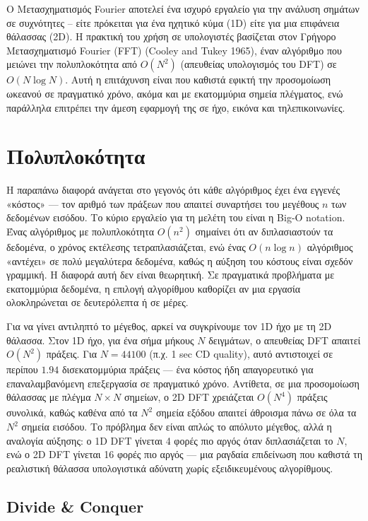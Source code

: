 Ο Μετασχηματισμός Fourier αποτελεί ένα ισχυρό εργαλείο για την ανάλυση
σημάτων σε συχνότητες -- είτε πρόκειται για ένα ηχητικό κύμα (1D) είτε
για μια επιφάνεια θάλασσας (2D). Η πρακτική του χρήση σε υπολογιστές
βασίζεται στον Γρήγορο Μετασχηματισμό Fourier (FFT) (Cooley and Tukey
1965), έναν αλγόριθμο που μειώνει την πολυπλοκότητα από \(O(N^2)\)
(απευθείας υπολογισμός του DFT) σε \(O(N \log N)\). Αυτή η επιτάχυνση
είναι που καθιστά εφικτή την προσομοίωση ωκεανού σε πραγματικό χρόνο,
ακόμα και με εκατομμύρια σημεία πλέγματος, ενώ παράλληλα επιτρέπει την
άμεση εφαρμογή της σε ήχο, εικόνα και τηλεπικοινωνίες.

\section{Πολυπλοκότητα}\label{ux3c0ux3bfux3bbux3c5ux3c0ux3bbux3bfux3baux3ccux3c4ux3b7ux3c4ux3b1}

Η παραπάνω διαφορά ανάγεται στο γεγονός ότι κάθε αλγόριθμος έχει ένα
εγγενές «κόστος» --- τον αριθμό των πράξεων που απαιτεί συναρτήσει του
μεγέθους \(n\) των δεδομένων εισόδου. Το κύριο εργαλείο για τη μελέτη
του είναι η Big-O notation. Ένας αλγόριθμος με πολυπλοκότητα \(O(n^2)\)
σημαίνει ότι αν διπλασιαστούν τα δεδομένα, ο χρόνος εκτέλεσης
τετραπλασιάζεται, ενώ ένας \(O(n \log n)\) αλγόριθμος «αντέχει» σε πολύ
μεγαλύτερα δεδομένα, καθώς η αύξηση του κόστους είναι σχεδόν γραμμική. Η
διαφορά αυτή δεν είναι θεωρητική. Σε πραγματικά προβλήματα με
εκατομμύρια δεδομένα, η επιλογή αλγορίθμου καθορίζει αν μια εργασία
ολοκληρώνεται σε δευτερόλεπτα ή σε μέρες.

Για να γίνει αντιληπτό το μέγεθος, αρκεί να συγκρίνουμε τον 1D ήχο με τη
2D θάλασσα. Στον 1D ήχο, για ένα σήμα μήκους \(N\) δειγμάτων, ο
απευθείας DFT απαιτεί \(O(N^2)\) πράξεις. Για \(N=44100\) (π.χ. 1 sec CD
quality), αυτό αντιστοιχεί σε περίπου \(1.94\) δισεκατομμύρια πράξεις
--- ένα κόστος ήδη απαγορευτικό για επαναλαμβανόμενη επεξεργασία σε
πραγματικό χρόνο. Αντίθετα, σε μια προσομοίωση θάλασσας με πλέγμα
\(N \times N\) σημείων, ο 2D DFT χρειάζεται \(O(N^4)\) πράξεις συνολικά,
καθώς καθένα από τα \(N^2\) σημεία εξόδου απαιτεί άθροισμα πάνω σε όλα
τα \(N^2\) σημεία εισόδου. Το πρόβλημα δεν είναι απλώς το απόλυτο
μέγεθος, αλλά η αναλογία αύξησης: ο 1D DFT γίνεται 4 φορές πιο αργός
όταν διπλασιάζεται το \(N\), ενώ ο 2D DFT γίνεται 16 φορές πιο αργός ---
μια ραγδαία επιδείνωση που καθιστά τη ρεαλιστική θάλασσα υπολογιστικά
αδύνατη χωρίς εξειδικευμένους αλγορίθμους.

\subsection{Divide \& Conquer}\label{divide-conquer}

